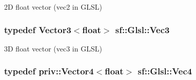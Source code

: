 2\-D float vector ({\ttfamily vec2} in G\-L\-S\-L) 

\hypertarget{namespacesf_1_1_glsl_a9bdd0463b7cb5316244a082007bd50f0}{
\subsubsection[{Vec3}]{\setlength{\rightskip}{0pt plus 5cm}typedef {\bf Vector3}$<$float$>$ {\bf sf\-::\-Glsl\-::\-Vec3}}}\label{namespacesf_1_1_glsl_a9bdd0463b7cb5316244a082007bd50f0}


3\-D float vector ({\ttfamily vec3} in G\-L\-S\-L) 

\hypertarget{namespacesf_1_1_glsl_a862f8df4771d2403de28653328fac5d0}{
\subsubsection[{Vec4}]{\setlength{\rightskip}{0pt plus 5cm}typedef {\bf priv\-::\-Vector4}$<$float$>$ {\bf sf\-::\-Glsl\-::\-Vec4}}}\label{namespacesf_1_1_glsl_a862f8df4771d2403de28653328fac5d0}
